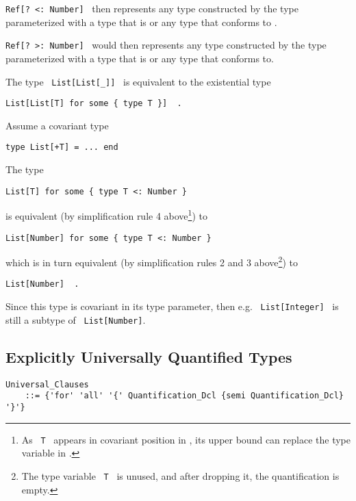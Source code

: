 \lstinline!Ref[? <: Number]!~ then represents any type constructed by the type parameterized with a type that is  or any type that conforms to . 

\lstinline!Ref[? >: Number]!~ would then represents any type constructed by the type  parameterized with a type that is  or any type that  conforms to. 

\example The type ~\lstinline!List[List[_]]!~ is equivalent to the existential type
\begin{lstlisting}
List[List[T] for some { type T }]  .
\end{lstlisting}

\example Assume a covariant type
\begin{lstlisting}
type List[+T] = ... end
\end{lstlisting}

The type 
\begin{lstlisting}
List[T] for some { type T <: Number }
\end{lstlisting}

is equivalent (by simplification rule 4 above\footnote{As ~\lstinline!T!~ appears in covariant position in , its upper bound can replace the type variable in .}) to
\begin{lstlisting}
List[Number] for some { type T <: Number }
\end{lstlisting}

which is in turn equivalent (by simplification rules 2 and 3 above\footnote{The type variable ~\lstinline!T!~ is unused, and after dropping it, the quantification is empty.}) to
\begin{lstlisting}
List[Number]  .
\end{lstlisting}

Since this  type is covariant in its type parameter, then e.g. ~\lstinline!List[Integer]!~ is still a subtype of ~\lstinline!List[Number]!. 





\subsection{Explicitly Universally Quantified Types}
\label{sec:universal-types}

\grammar\begin{lstlisting}
Universal_Clauses 
    ::= {'for' 'all' '{' Quantification_Dcl {semi Quantification_Dcl} '}'}
\end{lstlisting}

